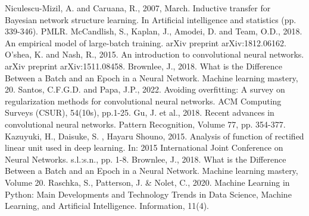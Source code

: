 \documentclass[conference]{IEEEtran}
\begin{document}

\begin{thebibliography}{00}
 Niculescu-Mizil, A. and Caruana, R., 2007, March. Inductive transfer for Bayesian network structure learning. In Artificial intelligence and statistics (pp. 339-346). PMLR.
 McCandlish, S., Kaplan, J., Amodei, D. and Team, O.D., 2018. An empirical model of large-batch training. arXiv preprint arXiv:1812.06162.
 O'shea, K. and Nash, R., 2015. An introduction to convolutional neural networks. arXiv preprint arXiv:1511.08458.
 Brownlee, J., 2018. What is the Difference Between a Batch and an Epoch in a Neural Network. Machine learning mastery, 20.
 Santos, C.F.G.D. and Papa, J.P., 2022. Avoiding overfitting: A survey on regularization methods for convolutional neural networks. ACM Computing Surveys (CSUR), 54(10s), pp.1-25.
 Gu, J. et al., 2018. Recent advances in convolutional neural networks. Pattern Recognition, Volume 77, pp. 354-377.
 Kazuyuki, H., Daisuke, S. , Hayaru Shouno, 2015. Analysis of function of rectified linear unit used in deep learning. In: 2015 International Joint Conference on Neural Networks. s.l.:s.n., pp. 1-8.
 Brownlee, J., 2018. What is the Difference Between a Batch and an Epoch in a Neural Network. Machine learning mastery, Volume 20.
 Raschka, S., Patterson, J. & Nolet, C., 2020. Machine Learning in Python: Main Developments and Technology Trends in Data Science, Machine Learning, and Artificial Intelligence. Information, 11(4).
\end{thebibliography}
\end{document}
